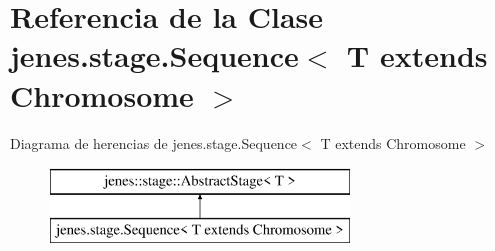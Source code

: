 \hypertarget{classjenes_1_1stage_1_1_sequence_3_01_t_01extends_01_chromosome_01_4}{\section{Referencia de la Clase jenes.\-stage.\-Sequence$<$ T extends Chromosome $>$}
\label{classjenes_1_1stage_1_1_sequence_3_01_t_01extends_01_chromosome_01_4}
}
Diagrama de herencias de jenes.\-stage.\-Sequence$<$ T extends Chromosome $>$\begin{figure}[H]
\begin{center}
\leavevmode
\includegraphics[height=2.000000cm]{classjenes_1_1stage_1_1_sequence_3_01_t_01extends_01_chromosome_01_4}
\end{center}
\end{figure}

